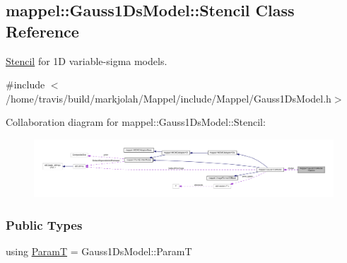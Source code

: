 \hypertarget{classmappel_1_1Gauss1DsModel_1_1Stencil}{}\subsection{mappel\+:\+:Gauss1\+Ds\+Model\+:\+:Stencil Class Reference}
\label{classmappel_1_1Gauss1DsModel_1_1Stencil}


\hyperlink{classmappel_1_1Gauss1DsModel_1_1Stencil}{Stencil} for 1D variable-\/sigma models.  




{\ttfamily \#include $<$/home/travis/build/markjolah/\+Mappel/include/\+Mappel/\+Gauss1\+Ds\+Model.\+h$>$}



Collaboration diagram for mappel\+:\+:Gauss1\+Ds\+Model\+:\+:Stencil\+:\nopagebreak
\begin{figure}[H]
\begin{center}
\leavevmode
\includegraphics[width=350pt]{classmappel_1_1Gauss1DsModel_1_1Stencil__coll__graph}
\end{center}
\end{figure}
\subsubsection*{Public Types}
\begin{DoxyCompactItemize}
\item 
using \hyperlink{classmappel_1_1Gauss1DsModel_1_1Stencil_adaba50464646fb95c5853b5c15365ed2}{ParamT} = Gauss1\+Ds\+Model\+::\+ParamT
\end{DoxyCompactItemize}
